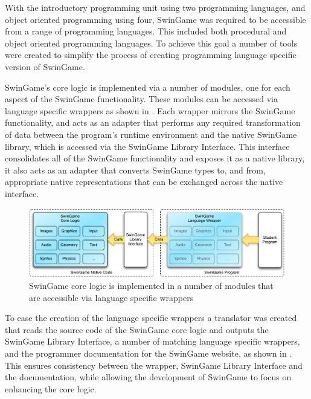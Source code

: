With the introductory programming unit using two programming languages, and object oriented programming using four, SwinGame was required to be accessible from a range of programming languages. This included both procedural and object oriented programming languages. To achieve this goal a number of tools were created to simplify the process of creating programming language specific version of SwinGame.

SwinGame's core logic is implemented via a number of modules, one for each aspect of the SwinGame functionality. These modules can be accessed via language specific wrappers as shown in . Each wrapper mirrors the SwinGame functionality, and acts as an adapter that performs any required transformation of data between the program's runtime environment and the native SwinGame library, which is accessed via the SwinGame Library Interface. This interface consolidates all of the SwinGame functionality and exposes it as a native library, it also acts as an adapter that converts SwinGame types to, and from, appropriate native representations that can be exchanged across the native interface. 

\begin{figure}[thbp]
  \centering
  \includegraphics[width=\textwidth]{SwinGameArch}
  \caption{SwinGame core logic is implemented in a number of modules that are accessible via language specific wrappers }
  \label{fig:swingame_arch}
\end{figure}

To ease the creation of the language specific wrappers a translator was created that reads the source code of the SwinGame core logic and outputs the SwinGame Library Interface, a number of matching language specific wrappers, and the programmer documentation for the SwinGame website, as shown in . This ensures consistency between the wrapper, SwinGame Library Interface and the documentation, while allowing the development of SwinGame to focus on enhancing the core logic.

